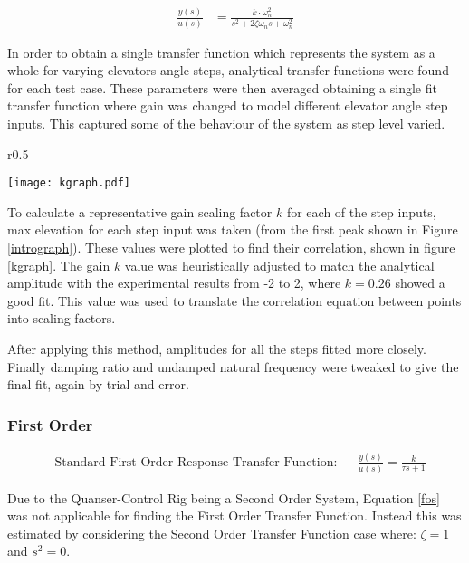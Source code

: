 \begin{align}
\frac{ y(s) }{ u(s) } &=\frac{ k\cdot \omega_{ n }^{ 2 } }{ s^{ 2 }+2\zeta \omega_{ n }s+\omega_{ n }^{ 2 } } \label{2otf}
\end{align}

In order to obtain a single transfer function which represents the
system as a whole for varying elevators angle steps, analytical transfer
functions were found for each test case. These parameters were then
averaged obtaining a single fit transfer function where gain was changed
to model different elevator angle step inputs. This captured some of the
behaviour of the system as step level varied.

\begin{wrapfigure}{r}{0.5\textwidth}
  \begin{center}
\vspace{-25pt}
\texttt{[image: kgraph.pdf]}  
\end{center}
\caption{Graph Finding the Gain For Each Step Input}
\label{kgraph}
  \vspace{-15pt}
\end{wrapfigure}

To calculate a representative gain scaling factor \(k\) for each of the
step inputs, max elevation for each step input was taken (from the first
peak shown in Figure \ref{intrograph}). These values were plotted to
find their correlation, shown in figure \ref{kgraph}. The gain \(k\)
value was heuristically adjusted to match the analytical amplitude with
the experimental results from -2 to 2, where \(k = 0.26\) showed a good
fit. This value was used to translate the correlation equation between
points into scaling factors.

After applying this method, amplitudes for all the steps fitted more
closely. Finally damping ratio and undamped natural frequency were
tweaked to give the final fit, again by trial and error.

\subsubsection{First Order}\label{first-order}

\begin{align}
 &\text{Standard First Order Response Transfer Function:} &&\frac { y(s) }{ u(s) } =\frac { k }{ \tau s+1 }
\label{fos}
\end{align}

Due to the Quanser-Control Rig being a Second Order System, Equation
\ref{fos} was not applicable for finding the First Order Transfer
Function. Instead this was estimated by considering the Second Order
Transfer Function case where: \(\zeta =1\) and \(s^2=0\).

